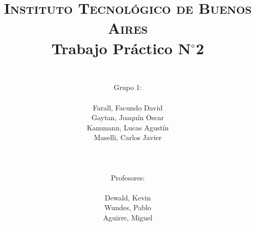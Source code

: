 




	\title{
		\normalfont \normalsize \textsc{Instituto Tecnol\'ogico de Buenos Aires} \\ [25pt]
		\huge Trabajo Pr\'actico N$^{\circ}$2 \\
		\author{
			\\Grupo 1:\\\\Farall, Facundo David\\Gaytan, Joaqu\'in Oscar\\Kammann, Lucas Agust\'in\\Maselli, Carlos Javier\\ \\ \\ \\
			Profesores: \\\\ Dewald, Kevin\\Wundes, Pablo\\Aguirre, Miguel \\ \\ 
		}
	}
	\maketitle
	\newpage

	\tableofcontents

	\newpage
	
	\newpage
	
	\newpage
	
	\newpage
	
	\newpage
	
	\newpage
	
	\newpage
	
	\newpage
	


